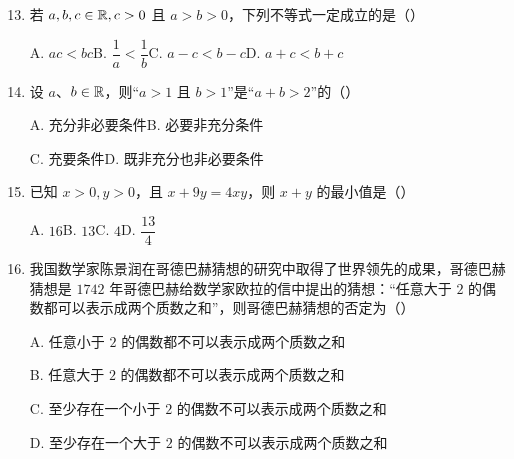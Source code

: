 
\begin{enumerate}
\setcounter{enumi}{12}

\item 若 $a,b,c\in\mathbb{R},c>0$ 且 $a>b>0$，下列不等式一定成立的是\mbox{（\quad）}

\keepwithprev
A. $ac<bc$\qquad B. $\dfrac1a<\dfrac1b$\qquad C. $a-c<b-c$\qquad D. $a+c<b+c$

\ifanswer
\solbegin
{}
\solend
\fi

\item 设 $a$、$b\in\mathbb{R}$，则“$a>1$ 且 $b>1$”是“$a+b>2$”的\mbox{（\quad）}

\keepwithprev
A. 充分非必要条件\qquad B. 必要非充分条件

C. 充要条件\qquad D. 既非充分也非必要条件

\ifanswer
\solbegin
{}
\solend
\fi

\item 已知 $x>0,y>0$，且 $x+9y=4xy$，则 $x+y$ 的最小值是\mbox{（\quad）}

\keepwithprev
A. $16$\qquad B. $13$\qquad C. $4$\qquad D. $\dfrac{13}{4}$

\ifanswer
\solbegin
{}
\solend
\fi

\item 我国数学家陈景润在哥德巴赫猜想的研究中取得了世界领先的成果，哥德巴赫猜想是 $1742$ 年哥德巴赫给数学家欧拉的信中提出的猜想：“任意大于 $2$ 的偶数都可以表示成两个质数之和”，则哥德巴赫猜想的否定为\mbox{（\quad）}%

\keepwithprev
A. 任意小于 $2$ 的偶数都不可以表示成两个质数之和

B. 任意大于 $2$ 的偶数都不可以表示成两个质数之和

C. 至少存在一个小于 $2$ 的偶数不可以表示成两个质数之和

D. 至少存在一个大于 $2$ 的偶数不可以表示成两个质数之和

\ifanswer
{}
\fi

\end{enumerate}

